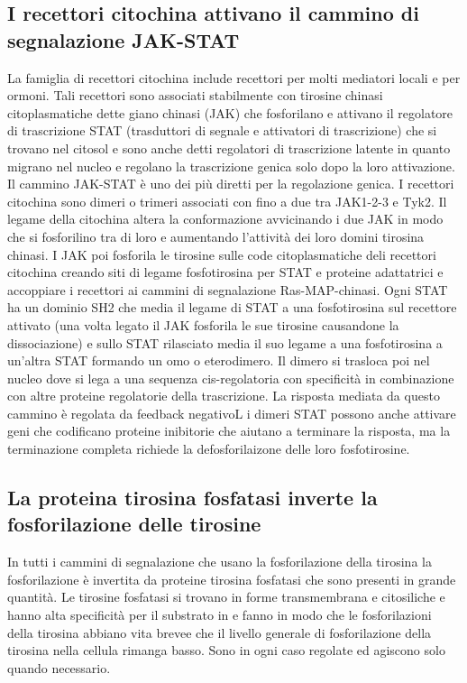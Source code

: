 \subsection{I recettori citochina attivano il cammino di segnalazione JAK-STAT}
La famiglia di recettori citochina include recettori per molti mediatori locali e per ormoni. Tali recettori sono associati stabilmente con tirosine chinasi citoplasmatiche dette 
giano chinasi (JAK) che fosforilano e attivano il regolatore di trascrizione STAT (trasduttori di segnale e attivatori di trascrizione) che si trovano nel citosol e sono anche detti
regolatori di trascrizione latente in quanto migrano nel nucleo e regolano la trascrizione genica solo dopo la loro attivazione. Il cammino JAK-STAT \`e uno dei pi\`u diretti per la
regolazione genica. I recettori citochina sono dimeri o trimeri associati con fino a due tra JAK1-2-3 e Tyk2. Il legame della citochina altera la conformazione avvicinando i due 
JAK in modo che si fosforilino tra di loro e aumentando l'attivit\`a dei loro domini tirosina chinasi. I JAK poi fosforila le tirosine sulle code citoplasmatiche deli recettori citochina
creando siti di legame fosfotirosina per STAT e proteine adattatrici e accoppiare i recettori ai cammini di segnalazione Ras-MAP-chinasi. Ogni STAT ha un dominio SH2 che media il 
legame di STAT a una fosfotirosina sul recettore attivato (una volta legato il JAK fosforila le sue tirosine causandone la dissociazione) e sullo STAT rilasciato media il suo legame
a una fosfotirosina a un'altra STAT formando un omo o eterodimero. Il dimero si trasloca poi nel nucleo dove si lega a una sequenza cis-regolatoria con specificit\`a in combinazione
con altre proteine regolatorie della trascrizione. La risposta mediata da questo cammino \`e regolata da feedback negativoL i dimeri STAT possono anche attivare geni che codificano 
proteine inibitorie che aiutano a terminare la risposta, ma la terminazione completa richiede la defosforilaizone delle loro fosfotirosine.
\subsection{La proteina tirosina fosfatasi inverte la fosforilazione delle tirosine}
In tutti i cammini di segnalazione che usano la fosforilazione della tirosina la fosforilazione \`e invertita da proteine tirosina fosfatasi che sono presenti in grande quantit\`a. 
Le tirosine fosfatasi si trovano in forme transmembrana e citosiliche e hanno alta specificit\`a per il substrato in e fanno in modo che le fosforilazioni della tirosina abbiano vita
brevee che il livello generale di fosforilazione della tirosina nella cellula rimanga basso. Sono in ogni caso regolate ed agiscono solo quando necessario. 
